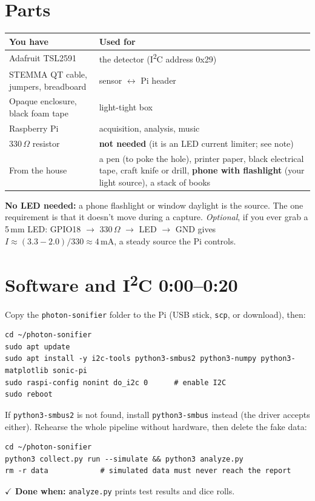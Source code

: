 \documentclass[11pt]{article}
\newcommand{\done}[1]{\par\smallskip\textcolor{ok}{\textbf{\(\checkmark\) Done when:}} #1\par}
\newcommand{\clock}[1]{\hfill\textcolor{black!55}{\small\textbf{#1}}}
\begin{document}
\section*{Parts}
\begin{tabularx}{\linewidth}{@{}l X@{}}
\toprule
You have & Used for \\
\midrule
Adafruit TSL2591 & the detector (I\textsuperscript{2}C address 0x29) \\
STEMMA QT cable, jumpers, breadboard & sensor $\leftrightarrow$ Pi header \\
Opaque enclosure, black foam tape & light-tight box \\
Raspberry Pi & acquisition, analysis, music \\
330\,$\Omega$ resistor & \textbf{not needed} (it is an LED current limiter; see note) \\
\midrule
From the house & a pen (to poke the hole), printer paper, black electrical tape,
craft knife or drill, \textbf{phone with flashlight} (your light source), a stack of books \\
\bottomrule
\end{tabularx}

\textbf{No LED needed:} a phone flashlight or window daylight is the source. The one requirement is that
it doesn't move during a capture. \textit{Optional}, if you ever grab a 5\,mm LED:
GPIO18 $\rightarrow$ 330\,$\Omega$ $\rightarrow$ LED $\rightarrow$ GND gives $I\approx(3.3-2.0)/330\approx4$\,mA, a
steady source the Pi controls.

\section{Software and I\textsuperscript{2}C \clock{0:00--0:20}}
Copy the \texttt{photon-sonifier} folder to the Pi (USB stick, \texttt{scp}, or download), then:
\begin{lstlisting}
cd ~/photon-sonifier
sudo apt update
sudo apt install -y i2c-tools python3-smbus2 python3-numpy python3-matplotlib sonic-pi
sudo raspi-config nonint do_i2c 0      # enable I2C
sudo reboot
\end{lstlisting}
If \texttt{python3-smbus2} is not found, install \texttt{python3-smbus} instead (the driver accepts either).
Rehearse the whole pipeline without hardware, then delete the fake data:
\begin{lstlisting}
cd ~/photon-sonifier
python3 collect.py run --simulate && python3 analyze.py
rm -r data            # simulated data must never reach the report
\end{lstlisting}
\done{\texttt{analyze.py} prints test results and dice rolls.}
\end{document}
